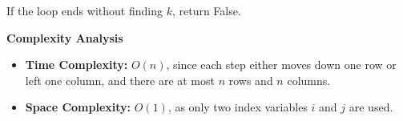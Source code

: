 \documentclass[12pt]{article}
\begin{document}
\begin{enumerate}
    If the loop ends without finding $k$, return False.

    \textbf{Complexity Analysis}

    \begin{itemize}
        \item \textbf{Time Complexity:} $O(n)$, since each step either moves down one row or left one column, and there are at most $n$ rows and $n$ columns.
        \item \textbf{Space Complexity:} $O(1)$, as only two index variables $i$ and $j$ are used.
    \end{itemize}
\end{enumerate}
\end{document}
